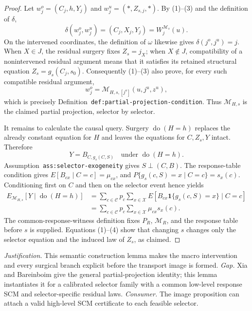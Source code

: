 \documentclass{article}
\begin{document}
\begin{proof}
Let \(w_j^o=(C_j,h,Y_j)\) and \(w_j^u=(\ast,Z_{s,j},\ast)\).  By (1)--(3) and the definition of \(\delta\),
\[
\delta(w_j^o,w_j^u)=(C_j,X_j,Y_j)=W_j^{\mathcal M_s}(u).
\]
On the intervened coordinates, the definition of \(\omega\) likewise gives \(\delta(j^o,j^u)=j\).  When \(X\in J\), the residual surgery fixes \(Z_s=j_X\); when \(X\notin J\), compatibility of a nonintervened residual argument means that it satisfies its retained structural equation \(Z_s=g_s(C_j,s_0)\).  Consequently (1)--(3) also prove, for every such compatible residual argument,
\[
w_j^o=\mathcal M_{H,s,[j^o]}(u,j^u,z^u),
\]
which is precisely Definition~\texttt{def:partial-projection-condition}.  Thus \(\mathcal M_{H,s}\) is the claimed partial projection, selector by selector.

It remains to calculate the causal query.  Surgery \(\operatorname{do}(H=h)\) replaces the already constant equation for \(H\) and leaves the equations for \(C,Z_s,Y\) intact.  Therefore
\[
Y=B_{C,g_s(C,S)}
\quad\text{under }\operatorname{do}(H=h).
\]
Assumption~\texttt{ass:selector-exogeneity} gives \(S\perp(C,B)\).  The response-table condition gives \(E[B_{cx}\mid C=c]=\mu_{cx}\), and \(P\{g_s(c,S)=x\mid C=c\}=s_x(c)\).  Conditioning first on \(C\) and then on the selector event hence yields
\[
\begin{aligned}
E_{\mathcal M_{H,s}}[Y\mid\operatorname{do}(H=h)]
&=\sum_{c\in\mathcal C}p_c
  \sum_{x\in\mathcal X}
  E\!\left[B_{cx}\mathbf 1\{g_s(c,S)=x\}\mid C=c\right]\\
&=\sum_{c\in\mathcal C}p_c
  \sum_{x\in\mathcal X}\mu_{cx}s_x(c).
\end{aligned}
\tag{4}
\]
The common-response-witness definition fixes \(P_R\), \(\mathcal M_R\), and the response table before \(s\) is supplied.  Equations (1)--(4) show that changing \(s\) changes only the selector equation and the induced law of \(Z_s\), as claimed.
\end{proof}
\par\smallskip\noindent \textit{Justification.} This semantic construction lemma makes the macro intervention and every surgical branch explicit before the transport image is formed. \textit{Gap.} Xia and Bareinboim give the general partial-projection identity; this lemma instantiates it for a calibrated selector family with a common low-level response SCM and selector-specific residual laws. \textit{Consumer.} The image proposition can attach a valid high-level SCM certificate to each feasible selector.
\end{document}
